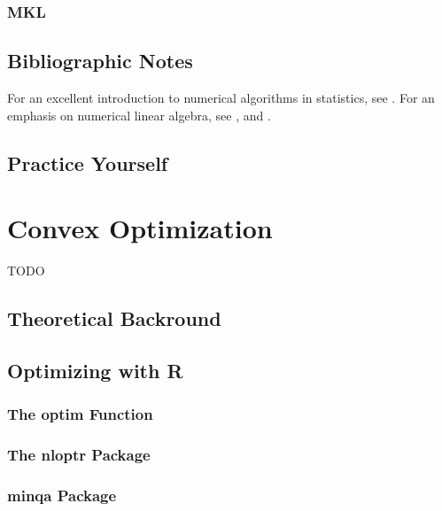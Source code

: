 \documentclass[]{book}
\theoremstyle{definition}
\theoremstyle{definition}
\theoremstyle{definition}
\theoremstyle{remark}
\begin{document}
\hypertarget{mkl}{%
\subsection{MKL}\label{mkl}}

\hypertarget{bibliographic-notes-15}{%
\section{Bibliographic Notes}\label{bibliographic-notes-15}}

For an excellent introduction to numerical algorithms in statistics, see \citet{weihs2013foundations}.
For an emphasis on numerical linear algebra, see \citet{gentle2012numerical}, and \citet{golub2012matrix}.

\hypertarget{practice-yourself-13}{%
\section{Practice Yourself}\label{practice-yourself-13}}

\hypertarget{convex}{%
\chapter{Convex Optimization}\label{convex}}

TODO

\hypertarget{theoretical-backround}{%
\section{Theoretical Backround}\label{theoretical-backround}}

\hypertarget{optimizing-with-r}{%
\section{Optimizing with R}\label{optimizing-with-r}}

\hypertarget{the-optim-function}{%
\subsection{The optim Function}\label{the-optim-function}}

\hypertarget{the-nloptr-package}{%
\subsection{The nloptr Package}\label{the-nloptr-package}}

\hypertarget{minqa-package}{%
\subsection{minqa Package}\label{minqa-package}}
\end{document}
